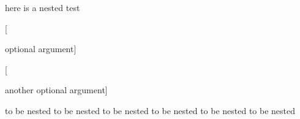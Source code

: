 here is a nested test
\begin{one}

	[

		optional argument]

	[


		another optional argument]




	to be nested to be nested
	to be nested to be nested
	to be nested to be nested
\end{one}
